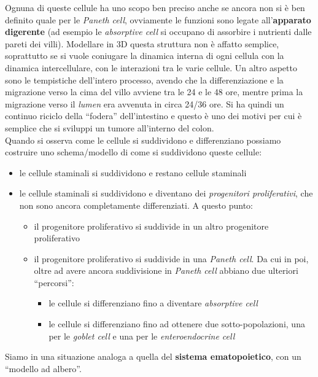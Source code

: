 \documentclass[a4paper,12pt, oneside]{book}
\begin{document}
Ognuna di queste cellule ha uno scopo ben preciso anche se ancora non si è ben
definito quale per le \textit{Paneth cell}, ovviamente le funzioni sono legate
all'\textbf{apparato digerente} (ad esempio le \textit{absorptive cell} si
occupano di assorbire i nutrienti dalle pareti dei villi). Modellare in 3D
questa struttura non è affatto semplice, soprattutto se si vuole coniugare la
dinamica interna di ogni cellula con la dinamica intercellulare, con le
interazioni tra le varie cellule. Un altro aspetto sono le tempistiche
dell'intero processo, avendo che la differenziazione e la migrazione verso la
cima del villo avviene tra le 24 e le 48 ore, mentre prima la migrazione verso
il \textit{lumen} era avvenuta in circa 24/36 ore. Si ha quindi un continuo
riciclo della ``fodera'' dell'intestino e questo è uno dei motivi per cui è
semplice che si sviluppi un tumore all'interno del colon.\\
Quando si osserva come le cellule si suddividono e differenziano possiamo
costruire uno schema/modello di come si suddividono queste cellule:
\begin{itemize}
  \item le cellule staminali si suddividono e restano cellule staminali
  \item le cellule staminali si suddividono e diventano dei \textit{progenitori
    proliferativi}, che non sono ancora completamente differenziati. A questo
  punto:
  \begin{itemize}
    \item il progenitore proliferativo si suddivide in un altro progenitore
    proliferativo 
    \item il progenitore proliferativo si suddivide in una \textit{Paneth
      cell}. Da cui in poi, oltre ad avere ancora suddivisione in \textit{Paneth
      cell} abbiano due ulteriori ``percorsi'': 
    \begin{itemize}
      \item le cellule si differenziano fino a diventare \textit{absorptive
        cell} 
      \item le cellule si differenziano fino ad ottenere due sotto-popolazioni,
      una per le \textit{goblet cell} e una per le \textit{enteroendocrine cell}
    \end{itemize}
  \end{itemize}
\end{itemize}
Siamo in una situazione analoga a quella del \textbf{sistema ematopoietico}, con
un ``modello ad albero''.\\
\end{document}
